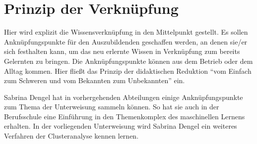 \section{Prinzip der Verknüpfung}
Hier wird explizit die Wissensverknüpfung in den Mittelpunkt gestellt. Es sollen Anknüpfungspunkte für den Auszubildenden geschaffen werden, an denen sie/er sich festhalten kann, um das neu erlernte Wissen in Verknüpfung zum bereits Gelernten zu bringen. Die Anknüpfungspunkte können aus dem Betrieb oder dem Alltag kommen. Hier fließt das Prinzip der didaktischen Reduktion \enquote{vom Einfach zum Schweren und vom Bekannten zum Unbekannten} ein.
\par
Sabrina Dengel hat in vorhergehenden Abteilungen einige Anknüpfungspunkte zum Thema der Unterweisung sammeln können. So hat sie auch in der Berufsschule eine Einführung in den Themenkomplex des maschinellen Lernens erhalten. In der vorliegenden Unterweisung wird Sabrina Dengel ein weiteres Verfahren der Clusteranalyse kennen lernen. 

